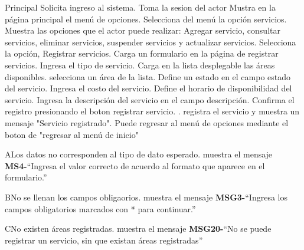 	\begin{UCtrayectoria}{Principal}
		\UCpaso[\UCactor] Solicita ingreso al sistema.
		\UCpaso Toma la sesion del actor
		\UCpaso Mustra en la página principal el menú de opciones.
		\UCpaso[\UCactor] Selecciona del menú la opción servicios.
		\UCpaso Muestra las opciones que el actor puede realizar: Agregar servicio, consultar servicios, eliminar servicios, suspender servicios y actualizar servicios.
		\UCpaso[\UCactor] Selecciona la opción, Registrar servicios. 
		\UCpaso Carga un formulario en la página de registrar servicios.
		\UCpaso[\UCactor] Ingresa el tipo de servicio.
		\UCpaso Carga en la lista desplegable las áreas disponibles. 
		\UCpaso[\UCactor] selecciona un área de la lista.
		\UCpaso[\UCactor] Define un estado en el campo estado del servicio.
		\UCpaso[\UCactor] Ingresa el costo del servicio.
		\UCpaso[\UCactor] Define el horario de disponibilidad del servicio.
		\UCpaso[\UCactor] Ingresa la descripción del servicio en el campo descripción.
		\UCpaso[\UCactor] Confirma el registro presionando el boton registrar servicio.  .
		\UCpaso registra el servicio y muestra un mensaje "Servicio registrado".
		\UCpaso[\UCactor] Puede regresar al menú de opciones mediante el boton de "regresar al menú de inicio"

	\end{UCtrayectoria}

		\begin{UCtrayectoriaA}{A}{Los datos no corresponden al tipo de dato esperado.}
		\UCpaso muestra el mensaje {\bf MS4-}``Ingresa el valor correcto de acuerdo al formato que aparece en el formulario.''
		\end{UCtrayectoriaA}

		\begin{UCtrayectoriaA}{B}{No se llenan los campos obligaorios.}
			\UCpaso muestra el mensaje {\bf MSG3-}``Ingresa los campos obligatorios marcados con * para continuar.''
		\end{UCtrayectoriaA}

		\begin{UCtrayectoriaA}{C}{No existen áreas registradas.}
			\UCpaso muestra el mensaje {\bf MSG20-}``No se puede registrar un servicio, sin que existan áreas registradas''
		\end{UCtrayectoriaA}
	
